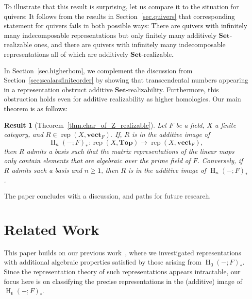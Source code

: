 \documentclass[a4paper]{amsart}
\theoremstyle{plain}
\newtheorem{resultx}{Result}
\theoremstyle{definition}
\theoremstyle{remark}
\newcommand{\Top}{\mathbf{Top}}
\newcommand{\Set}{\mathbf{Set}}
\newcommand{\vectF}{\mathbf{vect}_F}
\DeclareMathOperator{\rep}{rep}
\begin{document}
To illustrate that this result is surprising, let us compare it to the situation for quivers: It follows from the results in Section~\ref{sec.quivers} that corresponding statement for quivers fails in both possible ways: There are quivers with infinitely many indecomposable representations but only finitely many additively \( \Set \)-realizable ones, and there are quivers with infinitely many indecomposable representations all of which are additively \( \Set \)-realizable.

In Section~\ref{sec.higherhom}, we complement the discussion from Section~\ref{sec:scalarsfiniteorder} by showing that transcendental numbers appearing in a representation obstruct additive $\Set$-realizability. Furthermore, this obstruction holds even for additive realizability as higher homologies. Our main theorem is as follows:
\begin{resultx}[Theorem~\ref{thm.char_of_Z_realizable}]
Let \( F \) be a field, \( X \) a finite category, and \( R \in \rep(X, \vectF) \). If, \( R \) is in the additive image of 
\[ \operatorname{H}_n(-;F)_* \colon \rep(X, \Top) \to \rep(X, \vectF), \] then \( R \) admits a basis such that the matrix representations of the linear maps only contain elements that are algebraic over the prime field of \( F \). Conversely, if \( R \) admits such a basis and $n\geq 1$, then $R$ is in the additive image of $ \operatorname{H}_n(-;F)_*$. 
\end{resultx}
The paper concludes with a discussion, and paths for future research.

\section{Related Work}

This paper builds on our previous work~\cite{bauer2020cotorsion}, where we investigated representations with additional algebraic properties satisfied by those arising from $\operatorname{H}_0(-;F)_*$. Since the representation theory of such representations appears intractable, our focus here is on classifying the precise representations in the (additive) image of $\operatorname{H}_0(-;F)_*$. 
\end{document}
